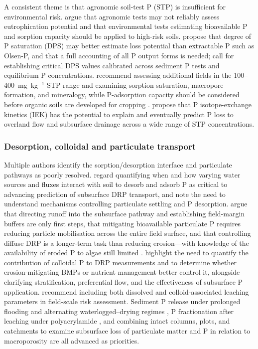 \documentclass[11pt]{article}
\begin{document}
A consistent theme is that agronomic soil-test P (STP) is insufficient for environmental risk. \textcite{Sharpley1995} argue that agronomic tests may not reliably assess eutrophication potential and that environmental tests estimating bioavailable P and sorption capacity should be applied to high-risk soils. \textcite{Hooda1999} propose that degree of P saturation (DPS) may better estimate loss potential than extractable P such as Olsen-P, and that a full accounting of all P output forms is needed; \textcite{Nguyen2002} call for establishing critical DPS values calibrated across sediment P tests and equilibrium P concentrations. \textcite{Osterholz2020} recommend assessing additional fields in the 100--400~mg~kg$^{-1}$ STP range and examining sorption saturation, macropore formation, and mineralogy, while P-adsorption capacity should be considered before organic soils are developed for cropping \parencite{MILLER1979}. \textcite{McDowell2001} propose that P isotope-exchange kinetics (IEK) has the potential to explain and eventually predict P loss to overland flow and subsurface drainage across a wide range of STP concentrations.

\subsubsection{Desorption, colloidal and particulate transport}

Multiple authors identify the sorption/desorption interface and particulate pathways as poorly resolved. \textcite{Mumbi2025} regard quantifying when and how varying water sources and fluxes interact with soil to desorb and adsorb P as critical to advancing prediction of subsurface DRP transport, and \textcite{Flores2021} note the need to understand mechanisms controlling particulate settling and P desorption. \textcite{Uusitalo2003} argue that directing runoff into the subsurface pathway and establishing field-margin buffers are only first steps, that mitigating bioavailable particulate P requires reducing particle mobilisation across the entire field surface, and that controlling diffuse DRP is a longer-term task than reducing erosion---with knowledge of the availability of eroded P to algae still limited \parencite{Ulén2007}. \textcite{Wilson2019} highlight the need to quantify the contribution of colloidal P to DRP measurements and to determine whether erosion-mitigating BMPs or nutrient management better control it, alongside clarifying stratification, preferential flow, and the effectiveness of subsurface P application. \textcite{Norgaard2013} recommend including both dissolved and colloid-associated leaching parameters in field-scale risk assessment. Sediment P release under prolonged flooding and alternating waterlogged--drying regimes \parencite{Nguyen2002}, P fractionation after leaching under polyacrylamide \parencite{Jiang2010}, and combining intact columns, plots, and catchments to examine subsurface loss of particulate matter and P in relation to macroporosity \parencite{Laubel1999} are all advanced as priorities.
\end{document}

